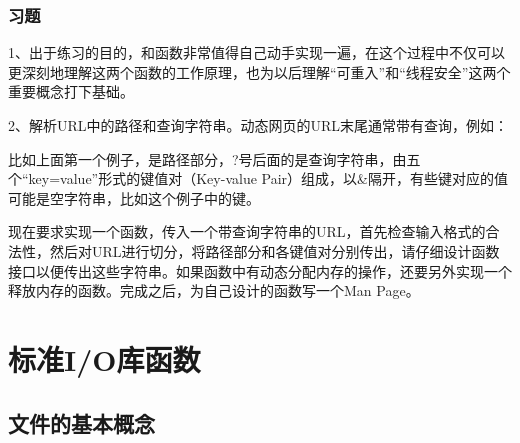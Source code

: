 \subsubsection*{习题}
%


1、出于练习的目的，和函数非常值得自己动手实现一遍，在这个过程中不仅可以更深刻地理解这两个函数的工作原理，也为以后理解“可重入”和“线程安全”这两个重要概念打下基础。



2、解析URL中的路径和查询字符串。动态网页的URL末尾通常带有查询，例如：


\begin{BookLiteral}
\end{BookLiteral}


比如上面第一个例子，是路径部分，?号后面的是查询字符串，由五个“key=\BookSplit{}value”形式的键值对（Key-value Pair）组成，以\&隔开，有些键对应的值可能是空字符串，比如这个例子中的键。



现在要求实现一个函数，传入一个带查询字符串的URL，首先检查输入格式的合法性，然后对URL进行切分，将路径部分和各键值对分别传出，请仔细设计函数接口以便传出这些字符串。如果函数中有动态分配内存的操作，还要另外实现一个释放内存的函数。完成之后，为自己设计的函数写一个Man Page。




\section{标准I/O库函数}
%
\subsection{文件的基本概念}
%


